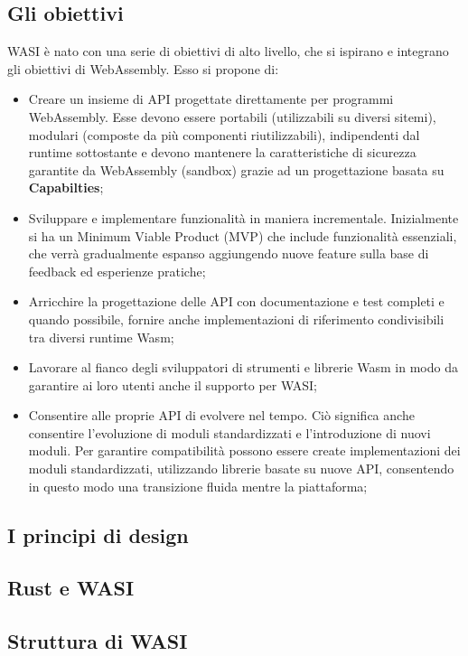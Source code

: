 \subsection{Gli obiettivi}
WASI è nato con una serie di obiettivi di alto livello, che si ispirano e integrano gli obiettivi di WebAssembly. Esso si propone di:
\begin{itemize}
        \item Creare un insieme di API progettate direttamente per programmi WebAssembly. Esse devono essere portabili (utilizzabili su diversi sitemi), modulari (composte da più componenti riutilizzabili), indipendenti dal runtime sottostante e devono mantenere la caratteristiche di sicurezza garantite da WebAssembly (sandbox) grazie ad un progettazione basata su \textbf{Capabilties};
        \item Sviluppare e implementare funzionalità in maniera incrementale. Inizialmente si ha un Minimum Viable Product (MVP) che include funzionalità essenziali, che verrà gradualmente espanso aggiungendo nuove feature sulla base di feedback ed esperienze pratiche;
        \item Arricchire la progettazione delle API con documentazione e test completi e quando possibile, fornire anche implementazioni di riferimento condivisibili tra diversi runtime Wasm;
        \item Lavorare al fianco degli sviluppatori di strumenti e librerie Wasm in modo da garantire ai loro utenti anche il supporto per WASI;
        \item Consentire alle proprie API di evolvere nel tempo. Ciò significa anche consentire l'evoluzione di moduli standardizzati e l'introduzione di nuovi moduli. Per garantire compatibilità possono essere create implementazioni dei moduli standardizzati, utilizzando librerie basate su nuove API, consentendo in questo modo una transizione fluida mentre la piattaforma;
\end{itemize}
\subsection{I principi di design}

\subsection{Rust e WASI}
\subsection{Struttura di WASI}
